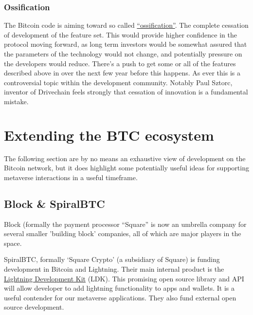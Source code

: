 \subsubsection{Ossification}
The Bitcoin code is aiming toward so called \href{https://en.wikipedia.org/wiki/Protocol_ossification}{``ossification''}. The complete cessation of development of the feature set. This would provide higher confidence in the protocol moving forward, as long term investors would be somewhat assured that the parameters of the technology would not change, and potentially pressure on the developers would reduce. There's a push to get some or all of the features described above in over the next few year before this happens. As ever this is a controversial topic within the development community. Notably Paul Sztorc, inventor of Drivechain feels strongly that cessation of innovation is a fundamental mistake.
\section{Extending the BTC ecosystem }
The following section are by no means an exhaustive view of development on the Bitcoin network, but it does highlight some potentially useful ideas for supporting metaverse interactions in a useful timeframe.
\subsection{Block \& SpiralBTC}
Block (formally the payment processor ``Square'' is now an umbrella company for several smaller 'building block' companies, all of which are major players in the space. \par
SpiralBTC, formally `Square Crypto' (a subsidiary of Square) is funding development in Bitcoin and Lightning. Their main internal product is the \href{https://spiral.xyz/blog/what-were-building-lightning-development-kit/}{Lightning Development Kit} (LDK). This promising open source library and API will allow developer to add lightning functionality to apps and wallets. It is a useful contender for our metaverse applications. They also fund external open source development.\par
